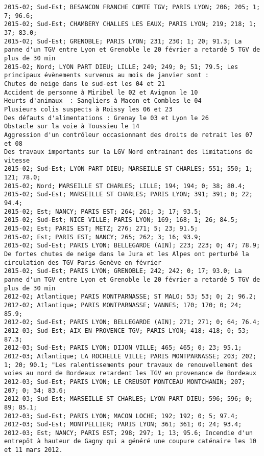 \documentclass{article}
\begin{document}
\begin{Verbatim}[commandchars=\\\{\}]
2015-02; Sud-Est; BESANCON FRANCHE COMTE TGV; PARIS LYON; 206; 205; 1; 7; 96.6; 
2015-02; Sud-Est; CHAMBERY CHALLES LES EAUX; PARIS LYON; 219; 218; 1; 37; 83.0; 
2015-02; Sud-Est; GRENOBLE; PARIS LYON; 231; 230; 1; 20; 91.3; La panne d'un TGV entre Lyon et Grenoble le 20 février a retardé 5 TGV de plus de 30 min
2015-02; Nord; LYON PART DIEU; LILLE; 249; 249; 0; 51; 79.5; Les principaux évènements survenus au mois de janvier sont :
Chutes de neige dans le sud-est les 04 et 21
Accident de personne à Miribel le 02 et Avignon le 10
Heurts d'animaux  : Sangliers à Macon et Combles le 04
Plusieurs colis suspects à Roissy les 06 et 23
Des défauts d'alimentations : Grenay le 03 et Lyon le 26
Obstacle sur la voie à Toussieu le 14
Aggression d'un contrôleur occasionnant des droits de retrait les 07 et 08
Des travaux importants sur la LGV Nord entrainant des limitations de vitesse
2015-02; Sud-Est; LYON PART DIEU; MARSEILLE ST CHARLES; 551; 550; 1; 121; 78.0; 
2015-02; Nord; MARSEILLE ST CHARLES; LILLE; 194; 194; 0; 38; 80.4; 
2015-02; Sud-Est; MARSEILLE ST CHARLES; PARIS LYON; 391; 391; 0; 22; 94.4; 
2015-02; Est; NANCY; PARIS EST; 264; 261; 3; 17; 93.5; 
2015-02; Sud-Est; NICE VILLE; PARIS LYON; 169; 168; 1; 26; 84.5; 
2015-02; Est; PARIS EST; METZ; 276; 271; 5; 23; 91.5; 
2015-02; Est; PARIS EST; NANCY; 265; 262; 3; 16; 93.9; 
2015-02; Sud-Est; PARIS LYON; BELLEGARDE (AIN); 223; 223; 0; 47; 78.9; De fortes chutes de neige dans le Jura et les Alpes ont perturbé la circulation des TGV Paris-Genève en février
2015-02; Sud-Est; PARIS LYON; GRENOBLE; 242; 242; 0; 17; 93.0; La panne d'un TGV entre Lyon et Grenoble le 20 février a retardé 5 TGV de plus de 30 min
2012-02; Atlantique; PARIS MONTPARNASSE; ST MALO; 53; 53; 0; 2; 96.2; 
2012-02; Atlantique; PARIS MONTPARNASSE; VANNES; 170; 170; 0; 24; 85.9; 
2012-02; Sud-Est; PARIS LYON; BELLEGARDE (AIN); 271; 271; 0; 64; 76.4; 
2012-03; Sud-Est; AIX EN PROVENCE TGV; PARIS LYON; 418; 418; 0; 53; 87.3; 
2012-03; Sud-Est; PARIS LYON; DIJON VILLE; 465; 465; 0; 23; 95.1; 
2012-03; Atlantique; LA ROCHELLE VILLE; PARIS MONTPARNASSE; 203; 202; 1; 20; 90.1; "Les ralentissements pour travaux de renouvellement des voies au nord de Bordeaux retardent les TGV en provenance de Bordeaux
2012-03; Sud-Est; PARIS LYON; LE CREUSOT MONTCEAU MONTCHANIN; 207; 207; 0; 34; 83.6; 
2012-03; Sud-Est; MARSEILLE ST CHARLES; LYON PART DIEU; 596; 596; 0; 89; 85.1; 
2012-03; Sud-Est; PARIS LYON; MACON LOCHE; 192; 192; 0; 5; 97.4; 
2012-03; Sud-Est; MONTPELLIER; PARIS LYON; 361; 361; 0; 24; 93.4; 
2012-03; Est; NANCY; PARIS EST; 298; 297; 1; 13; 95.6; Incendie d'un entrepôt à hauteur de Gagny qui a généré une coupure caténaire les 10 et 11 mars 2012.

\end{Verbatim}
\end{document}
